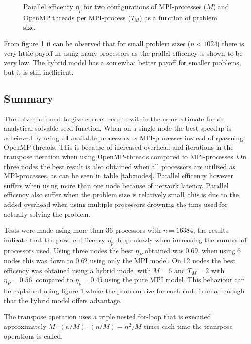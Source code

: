 \documentclass[11pt,a4paper,english]{article}
\numberwithin{figure}{subsection}
\numberwithin{table}{subsection}
\begin{document}
\begin{figure}[htbp]
	\centering
	
	\caption{Parallel efficency $\eta_p$ for two configurations of MPI-processes ($M$) and OpenMP threads per MPI-process ($T_M$) as a function of problem size.}
	\label{fig:peff}
\end{figure}

From figure \ref{fig:peff} it can be observed that for small problem sizes ($n<1024$) there is very little payoff in using many processors as the prallel efficency is shown to be very low. The hybrid model has a somewhat better payoff for smaller problems, but it is still inefficient.

\subsection{Summary}
The solver is found to give correct results within the error estimate for an analytical solvable seed function. When on a single node the best speedup is acheieved by using all available processors as MPI-processes instead of spawning OpenMP threads. This is because of increased overhead and iterations in the transpose iteration when using OpenMP-threads compared to MPI-processes. On three nodes the best result is also obtained when all processors are utilized as MPI-processes, as can be seen in table \ref{tab:nodes}. Parallel efficency however suffers when using more than one node because of network latency. Parallel efficency also suffer when the problem size is relatively small, this is due to the added overhead when using multiple processors drowning the time used for actually solving the problem.

Tests were made using more than 36 processors with $n=16384$, the results indicate that the parallel efficency $\eta_p$ drops slowly when increasing the number of processors used. Using three nodes the best $\eta_P$ obtained was 0.69, when using 6 nodes this was down to 0.62 using only the MPI model. On 12 nodes the best efficency was obtained using a hybrid model with $M=6$ and $T_M=2$ with $\eta_P=0.56$, compared to $\eta_p=0.46$ using the pure MPI model. This behaviour can be explained using figure \ref{fig:peff} where the problem size for each node is small enough that the hybrid model offers advantage.

The transpose operation uses a triple nested for-loop that is executed approximately $M\cdot (n/M)\cdot(n/M) = n^2/M$ times each time the transpose operations is called. 
\end{document}
